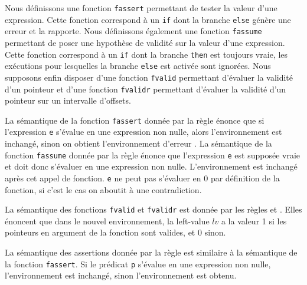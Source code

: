 Nous définissons une fonction \lstinline'fassert' permettant de tester la valeur
d'une expression.
Cette fonction correspond à un \lstinline'if' dont la branche
\lstinline'else' génère une erreur et la rapporte.
Nous définissons également une fonction \lstinline'fassume' permettant de poser
une hypothèse de validité sur la valeur d'une expression.
Cette fonction correspond à un \lstinline'if' dont
la branche \lstinline'then' est toujours vraie, les exécutions pour lesquelles
la branche \lstinline'else' est activée sont ignorées.
Nous supposons enfin disposer d'une fonction \lstinline'fvalid' permettant
d'évaluer la validité d'un pointeur et d'une fonction \lstinline'fvalidr'
permettant d'évaluer la validité d'un pointeur sur un intervalle d'offsets.

La sémantique de la fonction \lstinline'fassert' donnée par la règle
 énonce que si l'expression \lstinline'e' s'évalue en une
expression non nulle, alors l'environnement \env est inchangé, sinon on obtient
l'environnement d'erreur \errorenv.
La sémantique de la fonction \lstinline'fassume' donnée par la règle
 énonce que l'expression \lstinline'e' est supposée vraie et
doit donc s'évaluer en une expression non nulle.
L'environnement est inchangé après cet appel de fonction.
\lstinline'e' ne peut pas s'évaluer en 0 par définition de la fonction, si c'est
le cas on aboutit à une contradiction.

La sémantique des fonctions \lstinline'fvalid' et \lstinline'fvalidr' est donnée
par les règles  et .
Elles énoncent que dans le nouvel environnement, la left-value $lv$ a la valeur
1 si les pointeurs en argument de la fonction sont valides, et 0 sinon.

La sémantique des assertions \eacsl donnée par la règle  est
similaire à la sémantique de la fonction \lstinline'fassert'.
Si le prédicat \lstinline'p' s'évalue en une expression non nulle,
l'environnement \env est inchangé, sinon l'environnement \errorenv est obtenu.

